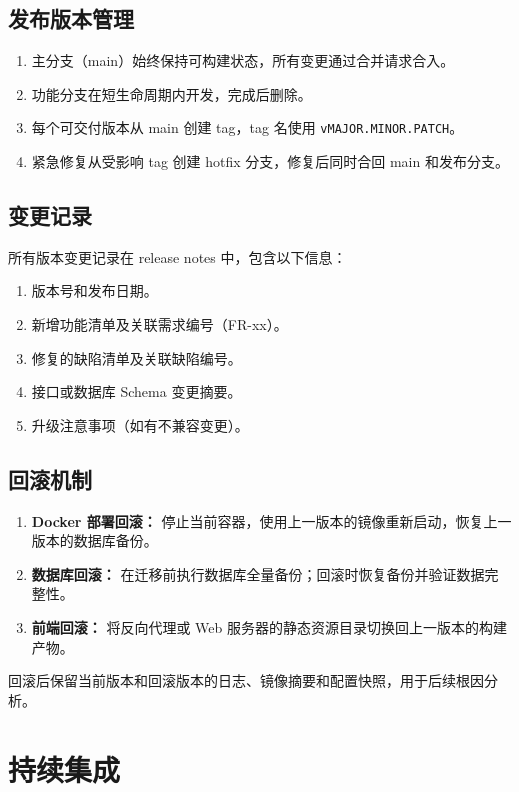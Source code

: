 \documentclass[12pt,a4paper]{ctexart}
\begin{document}
\subsection{发布版本管理}
\begin{enumerate}
\item 主分支（main）始终保持可构建状态，所有变更通过合并请求合入。
\item 功能分支在短生命周期内开发，完成后删除。
\item 每个可交付版本从 main 创建 tag，tag 名使用 \texttt{vMAJOR.MINOR.PATCH}。
\item 紧急修复从受影响 tag 创建 hotfix 分支，修复后同时合回 main 和发布分支。
\end{enumerate}

\subsection{变更记录}
所有版本变更记录在 release notes 中，包含以下信息：
\begin{enumerate}
\item 版本号和发布日期。
\item 新增功能清单及关联需求编号（FR-xx）。
\item 修复的缺陷清单及关联缺陷编号。
\item 接口或数据库 Schema 变更摘要。
\item 升级注意事项（如有不兼容变更）。
\end{enumerate}

\subsection{回滚机制}
\begin{enumerate}
\item \textbf{Docker 部署回滚：} 停止当前容器，使用上一版本的镜像重新启动，恢复上一版本的数据库备份。
\item \textbf{数据库回滚：} 在迁移前执行数据库全量备份；回滚时恢复备份并验证数据完整性。
\item \textbf{前端回滚：} 将反向代理或 Web 服务器的静态资源目录切换回上一版本的构建产物。
\end{enumerate}
回滚后保留当前版本和回滚版本的日志、镜像摘要和配置快照，用于后续根因分析。

\section{持续集成}
\end{document}
